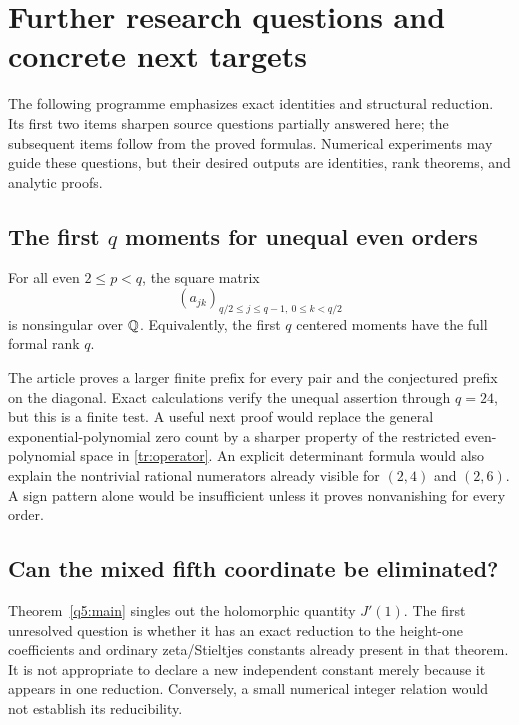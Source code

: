 \section{Further research questions and concrete next targets}
\label{sec:questions}

The following programme emphasizes exact identities and structural
reduction. Its first two items sharpen source questions partially
answered here; the subsequent items follow from the proved formulas.
Numerical experiments may guide these questions, but their desired
outputs are identities, rank theorems, and analytic proofs.

\subsection{The first \texorpdfstring{$q$}{q} moments for unequal even orders}

\begin{conjecture}\label{conj:firstq}
For all even $2\le p<q$, the square matrix
\[
 (a_{jk})_{q/2\le j\le q-1,\ 0\le k<q/2}
\]
is nonsingular over $\mathbb Q$. Equivalently, the first $q$ centered
moments have the full formal rank $q$.
\end{conjecture}

The article proves a larger finite prefix for every pair and the
conjectured prefix on the diagonal. Exact calculations verify the
unequal assertion through $q=24$, but this is a finite test.
A useful next proof would replace the general exponential-polynomial
zero count by a sharper property of the restricted even-polynomial
space in \eqref{tr:operator}. An explicit determinant formula would
also explain the nontrivial rational numerators already visible for
$(2,4)$ and $(2,6)$. A sign pattern alone would be insufficient unless
it proves nonvanishing for every order.

\subsection{Can the mixed fifth coordinate be eliminated?}

Theorem~\ref{q5:main} singles out the holomorphic quantity $J'(1)$.
The first unresolved question is whether it has an exact reduction
to the height-one coefficients and ordinary zeta/Stieltjes constants
already present in that theorem. It is not appropriate to declare a
new independent constant merely because it appears in one reduction.
Conversely, a small numerical integer relation would not establish
its reducibility.

